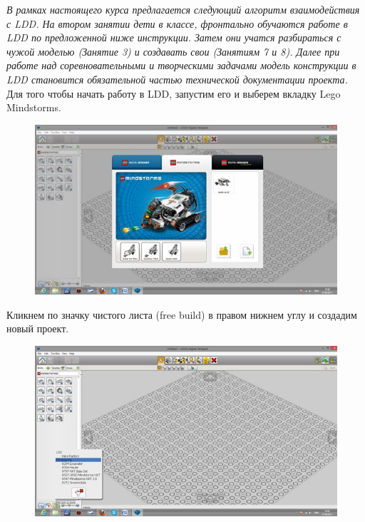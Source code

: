 {\slshape В рамках настоящего курса предлагается следующий алгоритм взаимодействия с LDD. На втором занятии дети  в классе, фронтально обучаются работе в LDD по предложенной ниже инструкции. Затем они учатся разбираться с чужой моделью (Занятие 3) и создавать свои (Занятиям 7 и 8). Далее при работе над соревновательными и творческими задачами модель конструкции в LDD становится обязательной частью технической документации проекта.}\\
Для того чтобы начать работу в LDD, запустим его и выберем вкладку Lego Mindstorms.
\begin{figure}[h!]
	\begin{center}
		\includegraphics[width=0.76\linewidth]{chapters/chapter3/images/2}
		\caption{}
		\label{ris:image3x2}
	\end{center}
\end{figure}	

Кликнем по значку чистого листа (free build) в правом нижнем углу и создадим новый проект.
\begin{figure}[h!]
	\begin{center}
		\includegraphics[width=0.8\linewidth]{chapters/chapter3/images/3}
		\caption{}
		\label{ris:image3x3}
	\end{center}
\end{figure}

